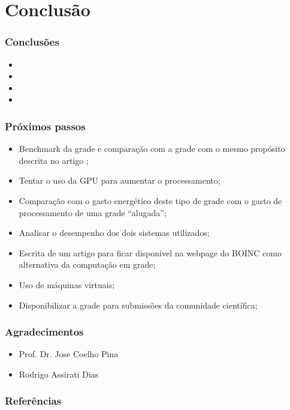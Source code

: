 \documentclass{beamer}
\begin{document}
\section{Conclusão}

\begin{frame}
  \frametitle{Conclusões}
  \begin{itemize}
    \item
    \item
    \item 
    \item   
  \end{itemize}
\end{frame}

\begin{frame}
  \frametitle{Próximos passos}
  \begin{itemize}
    \item Benchmark da grade e comparação com a grade com o mesmo propósito descrita no artigo \cite{Dias};
    \item Tentar o uso da GPU para aumentar o processamento;
    \item Comparação com o gasto energético deste tipo de grade com o gasto de processamento de uma grade ``alugada'';
    \item Analisar o desempenho dos dois sistemas utilizados;
    \item Escrita de um artigo para ficar disponível na webpage do BOINC como alternativa da computação em grade;
    \item Uso de máquinas virtuais; 
    \item Disponibilizar a grade para submissões da comunidade científica;
  \end{itemize}
\end{frame}

\begin{frame}
  \frametitle{Agradecimentos}
  \begin{itemize}
    \item Prof. Dr. Jose Coelho Pina
    \item Rodrigo Assirati Dias
  \end{itemize}
\end{frame}

\begin{frame}
  \frametitle{Referências}
  
  
\end{frame}
\end{document}
